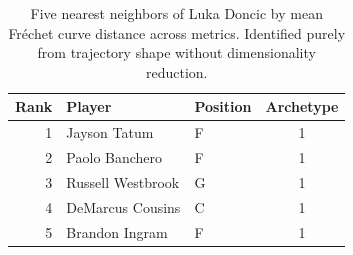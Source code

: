 \begin{table}[htbp]
  \centering\small
  \begin{tabular}{rllc}
    \toprule
    Rank & Player & Position & Archetype \\
    \midrule
    1 & Jayson Tatum & F & 1 \\
    2 & Paolo Banchero & F & 1 \\
    3 & Russell Westbrook & G & 1 \\
    4 & DeMarcus Cousins & C & 1 \\
    5 & Brandon Ingram & F & 1 \\
    \bottomrule
  \end{tabular}
  \caption{Five nearest neighbors of Luka Doncic by mean Fr\'{e}chet curve distance across metrics. Identified purely from trajectory shape without dimensionality reduction.}
  \label{tab:Luka_Doncic_frechet_curve_neighbors}
\end{table}

